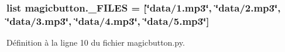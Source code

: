 \subsubsection[{\+\_\+\+F\+I\+L\+E\+S}]{\setlength{\rightskip}{0pt plus 5cm}list magicbutton.\+\_\+\+F\+I\+L\+E\+S = \mbox{[}\char`\"{}data/1.mp3\char`\"{}, \char`\"{}data/2.mp3\char`\"{}, \char`\"{}data/3.mp3\char`\"{}, \char`\"{}data/4.mp3\char`\"{}, \char`\"{}data/5.mp3\char`\"{}\mbox{]}}\label{namespacemagicbutton_a455c447797574051d8b852934c89cb68}


Définition à la ligne 10 du fichier magicbutton.\+py.

